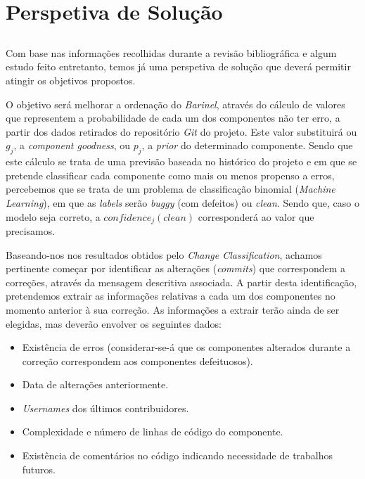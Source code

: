 \chapter{Perspetiva de Solução}\label{chap:chap3}

\section*{}

Com base nas informações recolhidas durante a revisão bibliográfica e algum estudo feito entretanto, temos já uma perspetiva de solução que deverá permitir atingir os objetivos propostos.

O objetivo será melhorar a ordenação do \emph{Barinel}, através do cálculo de valores que representem a probabilidade de cada um dos componentes não ter erro, a partir dos dados retirados do repositório \emph{Git} do projeto. Este valor substituirá ou $g_j$, a \emph{component goodness}, ou $p_j$, a \emph{prior} do determinado componente.
%
Sendo que este cálculo se trata de uma previsão baseada no histórico do projeto e em que se pretende classificar cada componente como mais ou menos propenso a erros, percebemos que se trata de um problema de classificação binomial (\emph{Machine Learning}), em que as \emph{labels} serão \emph{buggy} (com defeitos) ou \emph{clean}. Sendo que, caso o modelo seja correto, a $confidence_j(clean)$ corresponderá ao valor que precisamos.

Baseando-nos nos resultados obtidos pelo \emph{Change Classification}, achamos pertinente começar por identificar as alterações (\emph{commits}) que correspondem a correções, através da mensagem descritiva associada.
A partir desta identificação, pretendemos extrair as informações relativas a cada um dos componentes no momento anterior à sua correção. As informações a extrair terão ainda de ser elegidas, mas deverão envolver os seguintes dados:
%
\begin{itemize}
	\item Existência de erros (considerar-se-á que os componentes alterados durante a correção correspondem aos componentes defeituosos).
	\item Data de alterações anteriormente.
	\item \emph{Usernames} dos últimos contribuidores.
	\item Complexidade e número de linhas de código do componente.
	\item Existência de comentários no código indicando necessidade de trabalhos futuros.
\end{itemize}


